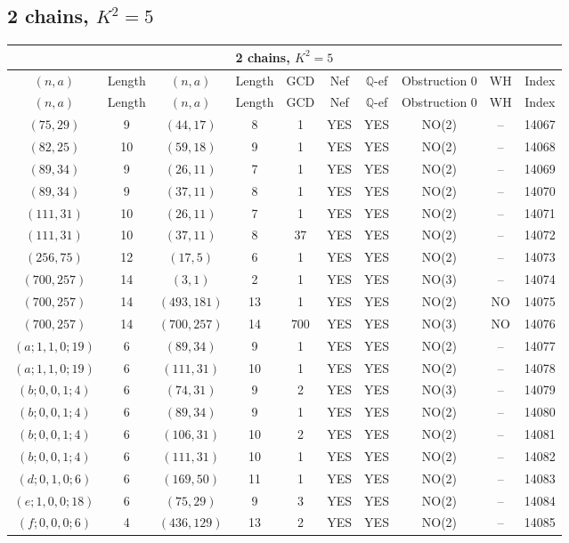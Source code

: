 \subsection{2 chains, \(K^2 = 5\)}
\begin{longtable}{|c|c|c|c|c|c|c|c|c|c|}
\hline
\multicolumn{10}{|c|}{2 chains, $K^2 = 5$}\\
\hline
$(n,a)$ & Length & $(n,a)$ & Length & GCD & Nef & $\mathbb Q$-ef & Obstruction 0 & WH & Index\\
\hline
\endfirsthead

\hline
$(n,a)$ & Length & $(n,a)$ & Length & GCD & Nef & $\mathbb Q$-ef & Obstruction 0 & WH & Index\\
\hline
\endhead
\hline
\endfoot

$(75, 29)$ & 9 & $(44, 17)$ & 8 & 1 & YES & YES & NO(2) & -- & 14067\\
$(82, 25)$ & 10 & $(59, 18)$ & 9 & 1 & YES & YES & NO(2) & -- & 14068\\
$(89, 34)$ & 9 & $(26, 11)$ & 7 & 1 & YES & YES & NO(2) & -- & 14069\\
$(89, 34)$ & 9 & $(37, 11)$ & 8 & 1 & YES & YES & NO(2) & -- & 14070\\
$(111, 31)$ & 10 & $(26, 11)$ & 7 & 1 & YES & YES & NO(2) & -- & 14071\\
$(111, 31)$ & 10 & $(37, 11)$ & 8 & 37 & YES & YES & NO(2) & -- & 14072\\
$(256, 75)$ & 12 & $(17, 5)$ & 6 & 1 & YES & YES & NO(2) & -- & 14073\\
$(700, 257)$ & 14 & $(3, 1)$ & 2 & 1 & YES & YES & NO(3) & -- & 14074\\
$(700, 257)$ & 14 & $(493, 181)$ & 13 & 1 & YES & YES & NO(2) & NO & 14075\\
$(700, 257)$ & 14 & $(700, 257)$ & 14 & 700 & YES & YES & NO(3) & NO & 14076\\
$(a; 1, 1, 0; 19)$ & 6 & $(89, 34)$ & 9 & 1 & YES & YES & NO(2) & -- & 14077\\
$(a; 1, 1, 0; 19)$ & 6 & $(111, 31)$ & 10 & 1 & YES & YES & NO(2) & -- & 14078\\
$(b; 0, 0, 1; 4)$ & 6 & $(74, 31)$ & 9 & 2 & YES & YES & NO(3) & -- & 14079\\
$(b; 0, 0, 1; 4)$ & 6 & $(89, 34)$ & 9 & 1 & YES & YES & NO(2) & -- & 14080\\
$(b; 0, 0, 1; 4)$ & 6 & $(106, 31)$ & 10 & 2 & YES & YES & NO(2) & -- & 14081\\
$(b; 0, 0, 1; 4)$ & 6 & $(111, 31)$ & 10 & 1 & YES & YES & NO(2) & -- & 14082\\
$(d; 0, 1, 0; 6)$ & 6 & $(169, 50)$ & 11 & 1 & YES & YES & NO(2) & -- & 14083\\
$(e; 1, 0, 0; 18)$ & 6 & $(75, 29)$ & 9 & 3 & YES & YES & NO(2) & -- & 14084\\
$(f; 0, 0, 0; 6)$ & 4 & $(436, 129)$ & 13 & 2 & YES & YES & NO(2) & -- & 14085
\end{longtable}
